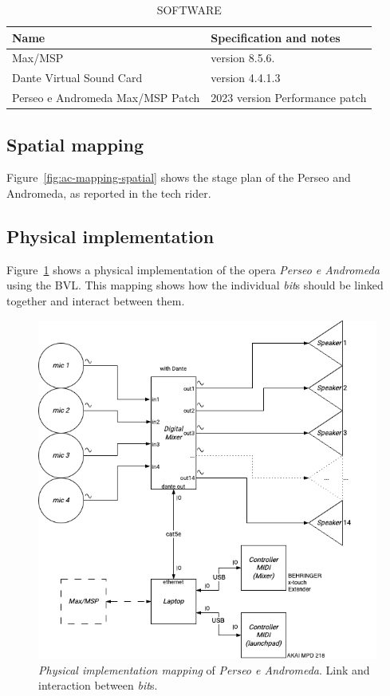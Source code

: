 \begin{longtable}{|p{}|p{}|}
    \caption{SOFTWARE} \label{tab:c-data-bits} \\
    \hline
    \textbf{Name} & \textbf{Specification and notes} \\
    \hline
    Max/MSP & \scriptsize version 8.5.6. \\\hline
    Dante Virtual Sound Card & \scriptsize version 4.4.1.3 \\\hline
    Perseo e Andromeda Max/MSP Patch & \scriptsize 2023 version Performance patch \\\hline 
\end{longtable}

\subsection*{Spatial mapping}
Figure~\ref{fig:ac-mapping-spatial} shows the stage plan of the Perseo and Andromeda, as reported in the tech rider. 

\subsection*{Physical implementation}
Figure~\ref{fig:ac-mapping-physical} shows a physical implementation of the opera \textit{Perseo e Andromeda} using the BVL. This mapping shows how the individual \textit{bit}s should be linked together and interact between them. 

\begin{figure}[!h]
    \centering
    \includegraphics[width=0.8\linewidth]{chapters/appendix/c/image/graphc-mapping-physical.png}
    \caption{\textit{Physical implementation mapping} of \textit{Perseo e Andromeda}. Link and interaction between \textit{bit}s.}
    \label{fig:ac-mapping-physical}
\end{figure}

